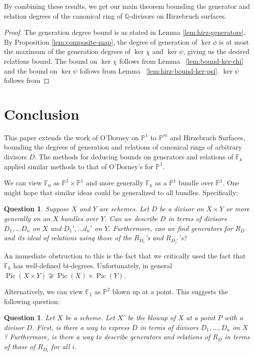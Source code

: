 \documentclass{amsart}
\theoremstyle{plain}
\newtheorem{question}[thm]{Question}
\theoremstyle{definition}
\theoremstyle{remark}
\numberwithin{equation}{section}
\newcommand\bq{{\mathbb Q}}
\newcommand\bp{{\mathbb P}}
\newcommand\hirz{\mathbb{F}}
\DeclareMathOperator{\Pic}{Pic}
\begin{document}
By combining these results, we get our main theorem bounding
the generator and relation degrees of the canonical ring of
$\bq$-divisors on Hirzebruch surfaces.

\hirzrestate*

\begin{proof}
The generation degree bound is as stated in Lemma \ref{lem:hirz-generators}.
By Proposition \ref{lem:composite-map}, the degree of generation of
$\ker \phi$ is at most the maximum of the generation degrees of $\ker \chi$
and $\ker \psi$, giving us the desired relations bound. The bound on $\ker \chi$
follows from Lemma ~\ref{lem:bound-ker-chi} and the bound on $\ker \psi$
follows from Lemma ~\ref{lem:hirz-bound-ker-psi}.
$\ker \psi$ follows from 
\end{proof}


\section{Conclusion}
\label{sec:conc}
This paper extends the work of O'Dorney \cite{dorney:canonical} on $\bp^1$ to
$\bp^m$ and Hirzebruch Surfaces, bounding the degrees of generation and
relations of canonical rings of arbitrary divisors $D$.  The methods for
deducing bounds on generators and relations of $\hirz_k$ applied similar
methods to that of O'Dorney's for $\bp^1$.  

We can view $\hirz_0$ as $\bp^1\times \bp^1$ and more generally $\hirz_k$ as a
$\bp^1$ bundle over $\bp^1$.  One might hope that similar ideas could be
generalized to all bundles.  Specifically:
\begin{question}
\label{qn:general-product-bundle}
Suppose $X$ and $Y$ are schemes.  Let $D$ be a divisor on $X\times Y$ or more
generally on an $X$ bundles over $Y$.  Can we describe $D$ in terms of divisors
$D_1, \ldots D_n$ on $X$ and $D_1', \ldots d_n'$ on $Y$.  Furthermore, can we
find generators for $R_D$ and its ideal of relations using those of the
$R_{D_i}$'s and $R_{D_j'}$'s?
\end{question}

An immediate obstruction to this is the fact that we critically used the fact
that $\hirz_k$ has well-defined bi-degrees.  Unfortunately, in general $\Pic(X
\times Y) \not \cong \Pic(X) \times \Pic(Y)$.

Alternatively, we can view $\hirz_1$ as $\bp^2$ blown up at a point.  This
suggests the following question:
\begin{question}
\label{qn:general-blowup}
Let $X$ be a scheme.  Let $X'$ be the blowup of $X$ at a point $P$ with a
divisor $D$.  First, is there a way to express $D$ in terms of divisors $D_1,
\ldots, D_n$ on $X$?  Furthermore, is there a way to describe generators and
relations of $R_D$ in terms of those of $R_{D_i}$ for all $i$.
\end{question}
\end{document}
